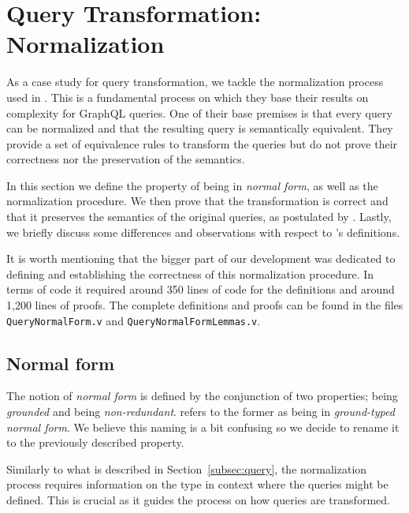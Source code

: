 
\section{Query Transformation: Normalization}\label{sec:norm}

As a case study for query transformation, we tackle the normalization process used in \HP{}. This is a fundamental process on which they base their results on complexity for GraphQL queries. One of their base premises is that every query can be normalized and that the resulting query is semantically equivalent. They provide a set of equivalence rules to transform the queries but do not prove their correctness nor the preservation of the semantics.

In this section we define the property of being in \textit{normal form}, as well as the normalization procedure. We then prove that the transformation is correct and that it preserves the semantics of the original queries, as postulated by \HP{}. Lastly, we briefly discuss some differences and observations with respect to \HP{}'s definitions.

It is worth mentioning that the bigger part of our development was dedicated to defining and establishing the correctness of this normalization procedure. In terms of code it required around 350 lines of code for the definitions and around 1,200 lines of proofs. The complete definitions and proofs can be found in the files \texttt{QueryNormalForm.v} and \texttt{QueryNormalFormLemmas.v}.

\subsection{Normal form}

The notion of \textit{normal form} is defined by the conjunction of two properties; being \textit{grounded} and being \textit{non-redundant}.
\HP{} refers to the former as being in \textit{ground-typed normal form}. We believe this naming is a bit confusing so we decide to rename it to the previously described property.

Similarly to what is described in Section~\ref{subsec:query}, the normalization process requires information on the type in context where the queries might be defined. This is crucial as it guides the process on how queries are transformed.

